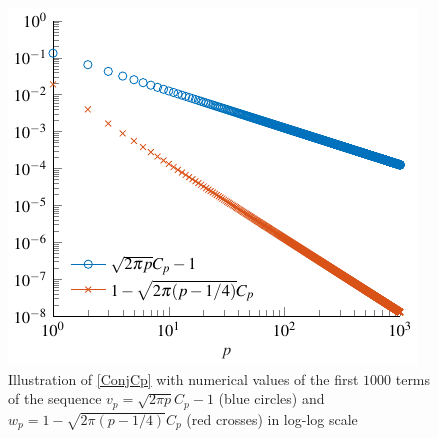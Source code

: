 \documentclass[smallextended]{svjour3}
\begin{document}
\begin{figure}[H]
	\centering
	\includegraphics[scale = 1]{EncadrementCp}
	\caption{Illustration of \autoref{ConjCp} with numerical values of the first $1000$ terms of the sequence ${v_p = \sqrt{2\pi p}C_p - 1}$ (blue circles) and ${w_p = 1 - \sqrt{2\pi(p-1/4)}C_p}$ (red crosses) in log-log scale}
	\label{figure:encadrementCp}
\end{figure}
\end{document}
